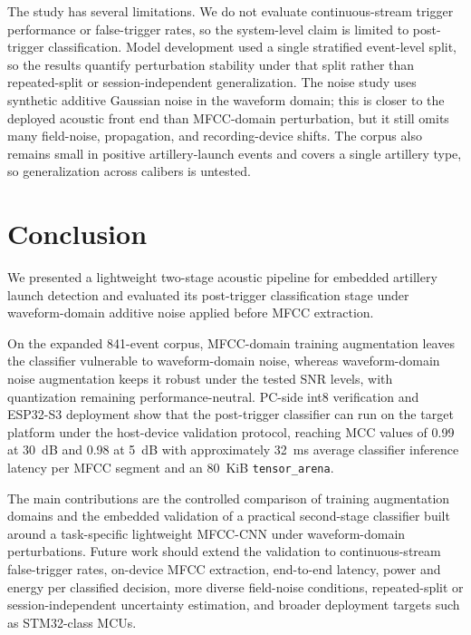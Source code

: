 ﻿\documentclass[conference]{IEEEtran}
\begin{document}
The study has several limitations. We do not evaluate continuous-stream trigger performance or false-trigger rates, so the system-level claim is limited to post-trigger classification. Model development used a single stratified event-level split, so the results quantify perturbation stability under that split rather than repeated-split or session-independent generalization. The noise study uses synthetic additive Gaussian noise in the waveform domain; this is closer to the deployed acoustic front end than MFCC-domain perturbation, but it still omits many field-noise, propagation, and recording-device shifts. The corpus also remains small in positive artillery-launch events and covers a single artillery type, so generalization across calibers is untested.
\section{Conclusion}
We presented a lightweight two-stage acoustic pipeline for embedded artillery launch detection and evaluated its post-trigger classification stage under waveform-domain additive noise applied before MFCC extraction.

On the expanded 841-event corpus, MFCC-domain training augmentation leaves the classifier vulnerable to waveform-domain noise, whereas waveform-domain noise augmentation keeps it robust under the tested SNR levels, with quantization remaining performance-neutral. PC-side int8 verification and ESP32-S3 deployment show that the post-trigger classifier can run on the target platform under the host-device validation protocol, reaching MCC values of 0.99 at 30~dB and 0.98 at 5~dB with approximately 32~ms average classifier inference latency per MFCC segment and an 80~KiB \texttt{tensor\_arena}.

The main contributions are the controlled comparison of training augmentation domains and the embedded validation of a practical second-stage classifier built around a task-specific lightweight MFCC-CNN under waveform-domain perturbations. Future work should extend the validation to continuous-stream false-trigger rates, on-device MFCC extraction, end-to-end latency, power and energy per classified decision, more diverse field-noise conditions, repeated-split or session-independent uncertainty estimation, and broader deployment targets such as STM32-class MCUs.



\end{document}
